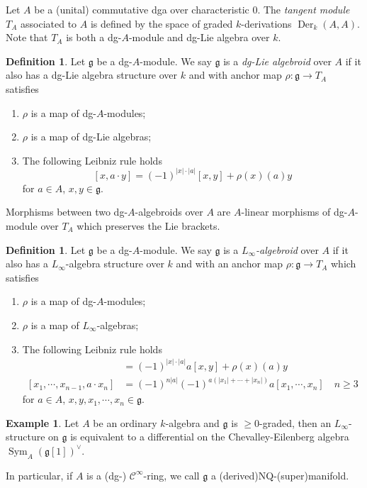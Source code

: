 \documentclass[12pt]{amsart}
\theoremstyle{definition}
\newtheorem{example}[thm]{Example}
\newtheorem{defn}[thm]{Definition}
\theoremstyle{remark}
\numberwithin{equation}{section}
\newcommand{\cinf}{{\mathcal C}^{\infty}}
\newcommand{\1}{{\mathbb{1}}}
\newcommand{\g}{\mathfrak{g}}
\newcommand{\der}{\operatorname{Der}}
\newcommand{\sym}{\operatorname{Sym}}
\begin{document}
Let $A$ be a (unital) commutative dga over characteristic 0. The {\it tangent module} $T_A$ associated to $A$ is defined by the space of graded $k$-derivations $\der_k(A, A)$. Note that $T_A$ is both a dg-$A$-module and dg-Lie algebra over $k$.

\begin{defn}
	Let $\g$ be a dg-$A$-module.
	We say $\g$ is a {\it dg-Lie algebroid}   over $A$ if it also has a dg-Lie algebra structure over $k$ and with anchor map $\rho: \g \to T_A$ satisfies
	\begin{enumerate}
		\item $\rho$ is a map of dg-$A$-modules;
		\item $\rho$ is a map of dg-Lie algebras;
		\item The following Leibniz rule holds
		$$ [x, a\cdot y ] = (-1)^{|x|\cdot |a|}[x,y] + \rho(x)(a) y $$
		for $a \in A$, $x, y\in \g$.
	\end{enumerate}
\end{defn}
Morphisms between two  dg-$A$-algebroids over $A$ are $A$-linear morphisms of dg-$A$-module over $T_A$ which preserves the Lie brackets.

\begin{defn}
    Let $\g$ be a dg-$A$-module.
    We say $\g$ is a {\it $L_{\infty}$-algebroid}   over $A$ if it also has a $L_{\infty}$-algebra structure over $k$ and with an anchor map $\rho: \g \to T_A$ which satisfies
    \begin{enumerate}
    	\item $\rho$ is a map of dg-$A$-modules;
    	\item $\rho$ is a map of $L_{\infty}$-algebras;
    	\item The following Leibniz rule holds
    	\begin{align}
    	[x, a\cdot y ] &= (-1)^{|x|\cdot |a|}a[x,y] + \rho(x)(a) y\\
    	[x_1, \cdots, x_{n-1},  a\cdot x_n ] &= (-1)^{n|a|}(-1)^{a(|x_1|+\cdots+|x_n|)}a[x_1, \cdots, x_n]\quad n\ge 3 
    	\end{align}
    	for $a\in A$, $x, y, x_1, \cdots, x_n \in \g$.
    \end{enumerate}
\end{defn}
\begin{example}
	Let $A$ be an ordinary $k$-algebra and $\g$ is $\ge 0$-graded, then an $L_{\infty}$-structure on $\g$ is equivalent to a differential on the Chevalley-Eilenberg algebra $\sym_A(\g[1])^{\vee}$.
	
	In particular, if $A$ is a (dg-) $\cinf$-ring, we call $\g$ a (derived)NQ-(super)manifold.
\end{example}
\end{document}
